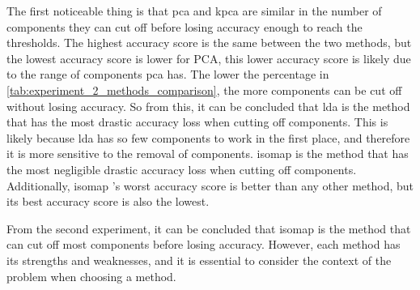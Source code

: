 The first noticeable thing is that \gls{pca} and \gls{kpca} are similar in the number of components they can cut off before losing accuracy enough to reach the thresholds. The highest accuracy score is the same between the two methods, but the lowest accuracy score is lower for PCA, this lower accuracy score is likely due to the range of components \gls{pca} has.  The lower the percentage in \autoref{tab:experiment_2_methods_comparison}, the more components can be cut off without losing accuracy. So from this, it can be concluded that \gls{lda}  is the method that has the most drastic accuracy loss when cutting off components. This is likely because \gls{lda}  has so few components to work in the first place, and therefore it is more sensitive to the removal of components. \gls{isomap}  is the method that has the most negligible drastic accuracy loss when cutting off components. Additionally, \gls{isomap} 's worst accuracy score is better than any other method, but its best accuracy score is also the lowest. 

From the second experiment, it can be concluded that \gls{isomap}  is the method that can cut off most components before losing accuracy. However, each method has its strengths and weaknesses, and it is essential to consider the context of the problem when choosing a method.



